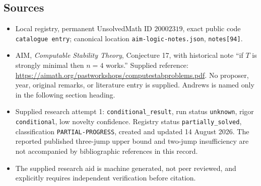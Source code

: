 \documentclass[11pt]{article}
\begin{document}
\subsection{Sources}
\begin{itemize}
\item Local registry, permanent UnsolvedMath ID \(20002319\), exact public code \texttt{catalogue entry}; canonical location \texttt{aim-logic-notes.json}, \texttt{notes[94]}.
\item AIM, \emph{Computable Stability Theory}, Conjecture 17, with historical note ``if \(T\) is strongly minimal then \(n=4\) works.'' Supplied reference: \url{https://aimath.org/pastworkshops/computestabproblems.pdf}. No proposer, year, original remarks, or literature entry is supplied. Andrews is named only in the following section heading.
\item Supplied research attempt 1: \texttt{conditional\_result}, run status \texttt{unknown}, rigor \texttt{conditional}, low novelty confidence. Registry status \texttt{partially\_solved}, classification \texttt{PARTIAL-PROGRESS}, created and updated 14 August 2026. The reported published three-jump upper bound and two-jump insufficiency are not accompanied by bibliographic references in this record.
\item The supplied research aid is machine generated, not peer reviewed, and explicitly requires independent verification before citation.
\end{itemize}
\end{document}

